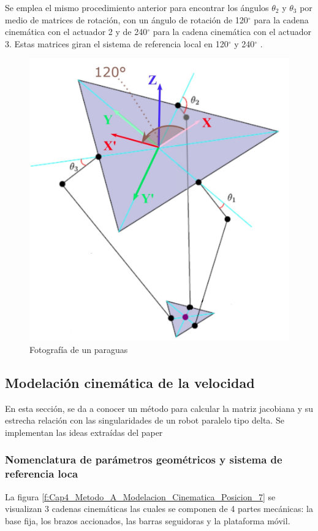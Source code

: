 Se emplea el mismo procedimiento anterior para encontrar los ángulos  \(  \theta _{2} \)  y  \(  \theta _{3} \)  por medio de matrices de rotación, con un ángulo de rotación de 120$ ^{\circ} $  para la cadena cinemática con el actuador 2 y de 240$ ^{\circ} $  para la cadena cinemática con el actuador 3. Estas matrices giran el sistema de referencia local en 120$ ^{\circ} $  y 240$ ^{\circ} $ . 

        \begin{figure}[htb]
             \centering
             \includegraphics[width=0.5\linewidth]{Main/Chapter4/Images4/DIBUJO5.jpg}
              \caption{Fotografía de un paraguas}
              \label{f:Cap4_Metodo_A_Modelacion_Cinematica_Posicion_6}
        \end{figure}

        \newpage

    \subsection{Modelación cinemática de la velocidad}\label{ma_cvel}
        En esta sección, se da a conocer un método para calcular la matriz jacobiana y su estrecha relación con las singularidades de un robot paralelo tipo delta. Se implementan las ideas extraídas del paper \cite{Hsu_modelling_ai}
    
        \subsubsection{Nomenclatura de parámetros geométricos y sistema de referencia loca}
        
        La figura \ref{f:Cap4_Metodo_A_Modelacion_Cinematica_Posicion_7} se visualizan 3 cadenas cinemáticas las cuales se componen de 4 partes mecánicas: la base fija, los brazos accionados, las barras seguidoras y la plataforma móvil.
        
